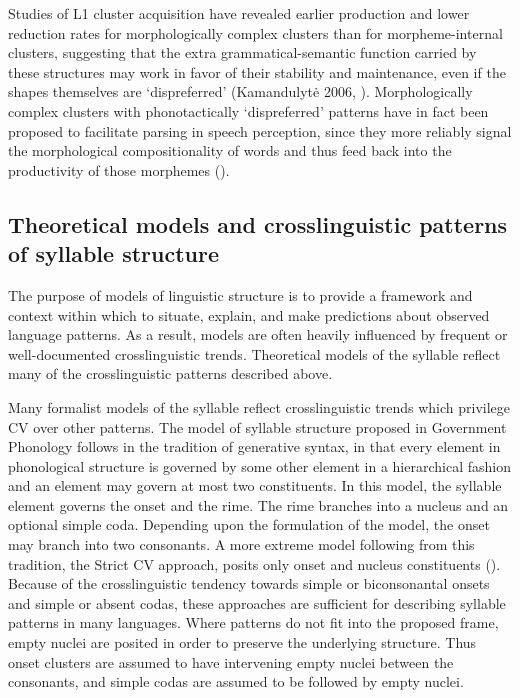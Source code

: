   Studies of L1 cluster acquisition have revealed earlier production and lower reduction rates for morphologically complex clusters than for morpheme-internal clusters, suggesting that the extra grammatical-semantic function carried by these structures may work in favor of their stability and maintenance, even if the shapes themselves are ‘dispreferred’ (Kamandulyt\.e 2006, \citealt{Zydorowicz2010}). Morphologically complex clusters with phonotactically ‘dispreferred’ patterns have in fact been proposed to facilitate parsing in speech perception, since they more reliably signal the morphological compositionality of words and thus feed back into the productivity of those morphemes (\citealt{HayBaayen2003,DresslerEtAl2010}). 

\subsection{Theoretical models and crosslinguistic patterns of syllable structure}\label{sec:1.1.3}

  The purpose of models of linguistic structure is to provide a framework and context within which to situate, explain, and make predictions about observed language patterns. As a result, models are often heavily influenced by frequent or well-documented crosslinguistic trends. Theoretical models of the syllable reflect many of the crosslinguistic patterns described above. 

  Many formalist models of the syllable reflect crosslinguistic trends which privilege CV over other patterns. The model of syllable structure proposed in Government Phonology \citep{KayeEtAl1990} follows in the tradition of generative syntax, in that every element in phonological structure is governed by some other element in a hierarchical fashion and an element may govern at most two constituents. In this model, the syllable element governs the onset and the rime. The rime branches into a nucleus and an optional simple coda. Depending upon the formulation of the model, the onset may branch into two consonants. A more extreme model following from this tradition, the Strict CV approach, posits only onset and nucleus constituents (\citealt{Lowenstamm1996,Scheer2004}). Because of the crosslinguistic tendency towards simple or biconsonantal onsets and simple or absent codas, these approaches are sufficient for describing syllable patterns in many languages. Where patterns do not fit into the proposed frame, empty nuclei are posited in order to preserve the underlying structure. Thus onset clusters are assumed to have intervening empty nuclei between the consonants, and simple codas are assumed to be followed by empty nuclei.

